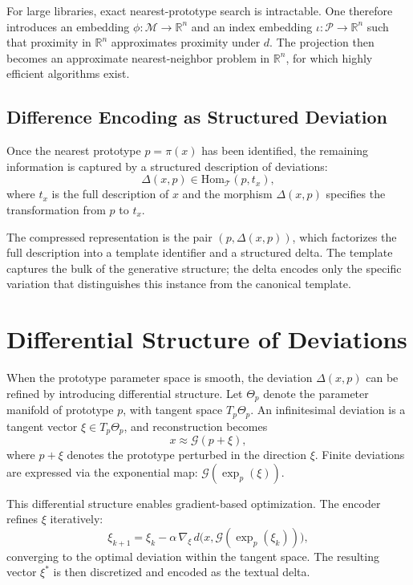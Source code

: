 \documentclass[12pt,a4paper]{article}
\theoremstyle{definition}
\theoremstyle{remark}
\begin{document}
For large libraries, exact nearest-prototype search is intractable. One therefore introduces an embedding $\phi : \mathcal{M} \rightarrow \mathbb{R}^n$ and an index embedding $\iota : \mathcal{P} \rightarrow \mathbb{R}^n$ such that proximity in $\mathbb{R}^n$ approximates proximity under $d$. The projection then becomes an approximate nearest-neighbor problem in $\mathbb{R}^n$, for which highly efficient algorithms exist.

\subsection{Difference Encoding as Structured Deviation}

Once the nearest prototype $p = \pi(x)$ has been identified, the remaining information is captured by a structured description of deviations:
\[
\Delta(x, p) \in \mathrm{Hom}_\mathcal{T}(p, t_x),
\]
where $t_x$ is the full description of $x$ and the morphism $\Delta(x,p)$ specifies the transformation from $p$ to $t_x$.

The compressed representation is the pair $(p, \Delta(x,p))$, which factorizes the full description into a template identifier and a structured delta. The template captures the bulk of the generative structure; the delta encodes only the specific variation that distinguishes this instance from the canonical template.

\section{Differential Structure of Deviations}
\label{sec:differential}

When the prototype parameter space is smooth, the deviation $\Delta(x,p)$ can be refined by introducing differential structure. Let $\Theta_p$ denote the parameter manifold of prototype $p$, with tangent space $T_p\Theta_p$. An infinitesimal deviation is a tangent vector $\xi \in T_p\Theta_p$, and reconstruction becomes
\[
x \approx \mathcal{G}(p + \xi),
\]
where $p + \xi$ denotes the prototype perturbed in the direction $\xi$. Finite deviations are expressed via the exponential map: $\mathcal{G}(\exp_p(\xi))$.

This differential structure enables gradient-based optimization. The encoder refines $\xi$ iteratively:
\[
\xi_{k+1} = \xi_k - \alpha \, \nabla_\xi \, d\big(x, \mathcal{G}(\exp_p(\xi_k))\big),
\]
converging to the optimal deviation within the tangent space. The resulting vector $\xi^*$ is then discretized and encoded as the textual delta.
\end{document}
